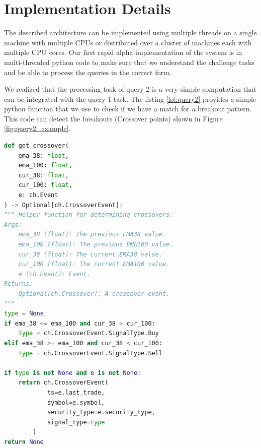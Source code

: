 


\section{Implementation Details}\label{sec:implementation}
The described architecture can be implemented using multiple threads on a single machine with multiple CPUs or distributed over a cluster of machines each with multiple CPU cores. Our first rapid alpha implementation of the system is in multi-threaded python code to make sure that we understand the challenge tasks and be able to process the queries in the correct form.  


We realized that the processing task of query 2 is a very simple computation that can be integrated with the query 1 task. 
The listing \ref{lst:query2} provides a simple python function that we use to check if we have a match for a breakout pattern. 
This code can detect the breakouts (Crossover points) shown in Figure \ref{fig:query2_example}.




\begin{minipage}{0.9\linewidth}
\begin{lstlisting}[caption={The computation for Query 2 - Breakout Patterns of EMA38 and EMA100}, label={lst:query2},language=Python]
def get_crossover(
    ema_38: float,
    ema_100: float,
    cur_38: float,
    cur_100: float,
    e: ch.Event
) -> Optional[ch.CrossoverEvent]:
""" Helper function for determining crossovers.
Args:
    ema_38 (float): The previous EMA38 value.
    ema_100 (float): The previous EMA100 value.
    cur_38 (float): The current EMA38 value.
    cur_100 (float): The current EMA100 value.
    e (ch.Event): Event.
Returns:
    Optional[ch.Crossover]: A crossover event.
"""
type = None
if ema_38 <= ema_100 and cur_38 > cur_100:
    type = ch.CrossoverEvent.SignalType.Buy
elif ema_38 >= ema_100 and cur_38 < cur_100:
    type = ch.CrossoverEvent.SignalType.Sell

if type is not None and e is not None:
    return ch.CrossoverEvent(
            ts=e.last_trade,
            symbol=e.symbol,
            security_type=e.security_type,
            signal_type=type
        )    
return None
\end{lstlisting}
\end{minipage}





